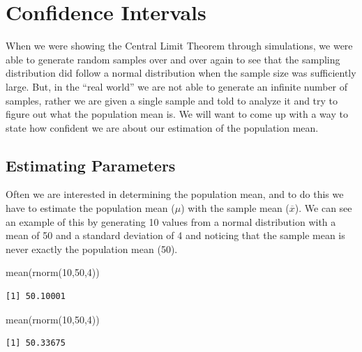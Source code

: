 \documentclass[
  letterpaper,
  DIV=11,
  numbers=noendperiod]{scrreprt}
\newenvironment{Shaded}{\begin{snugshade}}{\end{snugshade}}
\newcommand{\DecValTok}[1]{\textcolor[rgb]{0.68,0.00,0.00}{#1}}
\newcommand{\FunctionTok}[1]{\textcolor[rgb]{0.28,0.35,0.67}{#1}}
\newcommand{\NormalTok}[1]{\textcolor[rgb]{0.00,0.23,0.31}{#1}}
\begin{document}

\chapter{Confidence Intervals}\label{confidence-intervals}

When we were showing the Central Limit Theorem through simulations, we
were able to generate random samples over and over again to see that the
sampling distribution did follow a normal distribution when the sample
size was sufficiently large. But, in the ``real world'' we are not able
to generate an infinite number of samples, rather we are given a single
sample and told to analyze it and try to figure out what the population
mean is. We will want to come up with a way to state how confident we
are about our estimation of the population mean.

\section{Estimating Parameters}\label{estimating-parameters}

Often we are interested in determining the population mean, and to do
this we have to estimate the population mean (\(\mu\)) with the sample
mean (\(\overline{x}\)). We can see an example of this by generating 10
values from a normal distribution with a mean of 50 and a standard
deviation of 4 and noticing that the sample mean is never exactly the
population mean (50).

\begin{Shaded}
\begin{Highlighting}[]
\FunctionTok{mean}\NormalTok{(}\FunctionTok{rnorm}\NormalTok{(}\DecValTok{10}\NormalTok{,}\DecValTok{50}\NormalTok{,}\DecValTok{4}\NormalTok{))}
\end{Highlighting}
\end{Shaded}

\begin{verbatim}
[1] 50.10001
\end{verbatim}

\begin{Shaded}
\begin{Highlighting}[]
\FunctionTok{mean}\NormalTok{(}\FunctionTok{rnorm}\NormalTok{(}\DecValTok{10}\NormalTok{,}\DecValTok{50}\NormalTok{,}\DecValTok{4}\NormalTok{))}
\end{Highlighting}
\end{Shaded}

\begin{verbatim}
[1] 50.33675
\end{verbatim}
\end{document}
